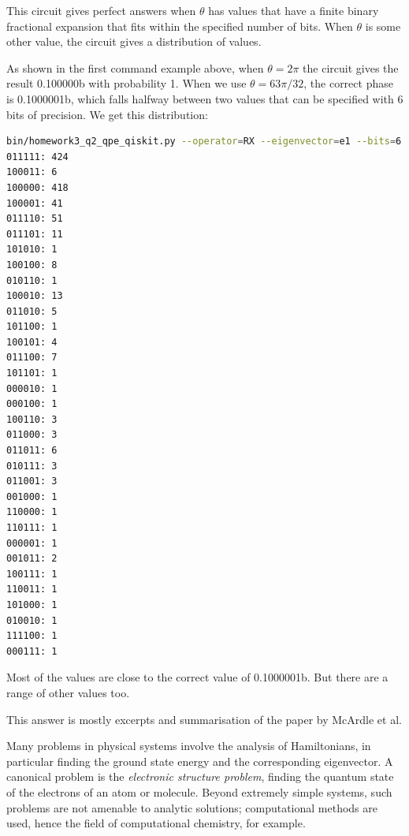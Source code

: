 \documentclass[12pt]{extarticle}
\begin{document}
This circuit gives perfect answers when $\theta$ has values that have a finite binary fractional expansion that fits within the specified number of bits.
When $\theta$ is some other value, the circuit gives a distribution of values.

As shown in the first command example above, when $\theta=2\pi$ the circuit gives the result 0.100000b with probability 1.
When we use $\theta=63\pi/32$, the correct phase is 0.1000001b, which falls halfway between two values that can be specified with 6 bits of precision.
We get this distribution:

\begin{lstlisting}[language=bash]
bin/homework3_q2_qpe_qiskit.py --operator=RX --eigenvector=e1 --bits=6 --theta="63*pi/32"
011111: 424
100011: 6
100000: 418
100001: 41
011110: 51
011101: 11
101010: 1
100100: 8
010110: 1
100010: 13
011010: 5
101100: 1
100101: 4
011100: 7
101101: 1
000010: 1
000100: 1
100110: 3
011000: 3
011011: 6
010111: 3
011001: 3
001000: 1
110000: 1
110111: 1
000001: 1
001011: 2
100111: 1
110011: 1
101000: 1
010010: 1
111100: 1
000111: 1
\end{lstlisting}

Most of the values are close to the correct value of 0.1000001b.
But there are a range of other values too.


\newpage
{}

This answer is mostly excerpts and summarisation of the paper by McArdle et al\cite{mcardle2020}.

Many problems in physical systems involve the analysis of Hamiltonians, in particular finding the ground state energy and the corresponding eigenvector.
A canonical problem is the \textit{electronic structure problem}, finding the quantum state of the electrons of an atom or molecule.
Beyond extremely simple systems, such problems are not amenable to analytic solutions; computational methods are used, hence the field of computational chemistry, for example.
\end{document}
